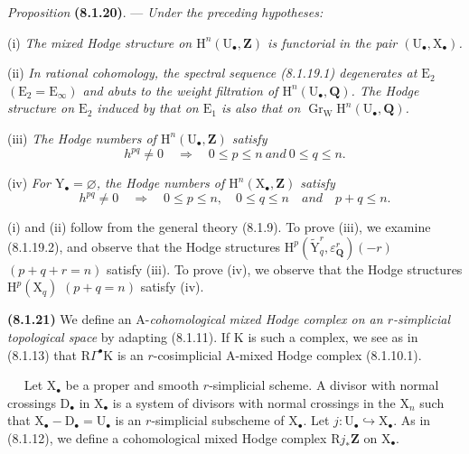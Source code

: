 \documentclass[11pt,leqno]{article}
\newcommand{\Page}[1]{\ifvmode\noindent\else\unskip\ \fi{\footnotesize\textcolor{gray}{[p.\,#1]}}\ \ignorespaces}
\begin{document}
\textit{Proposition} \textbf{(8.1.20)}. — \textit{Under the preceding hypotheses:}

(i) \textit{The mixed Hodge structure on \(\mathrm{H}^{n}(\mathrm{U}_{\bullet},\mathbf{Z})\) is functorial in the pair \((\mathrm{U}_{\bullet},\mathrm{X}_{\bullet})\).}

(ii) \textit{In rational cohomology, the spectral sequence (8.1.19.1) degenerates at \(\mathrm{E}_{2}\) \((\mathrm{E}_{2}=\mathrm{E}_{\infty})\) and abuts to the weight filtration of \(\mathrm{H}^{n}(\mathrm{U}_{\bullet},\mathbf{Q})\). The Hodge structure on \(\mathrm{E}_{2}\) induced by that on \(\mathrm{E}_{1}\) is also that on \(\operatorname{Gr}_{\mathrm{W}}\mathrm{H}^{n}(\mathrm{U}_{\bullet},\mathbf{Q})\).}

(iii) \textit{The Hodge numbers of \(\mathrm{H}^{n}(\mathrm{U}_{\bullet},\mathbf{Z})\) satisfy}
\[
h^{pq}\neq0
\quad\Rightarrow\quad
0\leq p\leq n\ \textit{and}\ 0\leq q\leq n.
\]

(iv) \textit{For \(\mathrm{Y}_{\bullet}=\varnothing\), the Hodge numbers of \(\mathrm{H}^{n}(\mathrm{X}_{\bullet},\mathbf{Z})\) satisfy}
\[
h^{pq}\neq0
\quad\Rightarrow\quad
0\leq p\leq n,\quad 0\leq q\leq n
\quad\textit{and}\quad p+q\leq n.
\]

(i) and (ii) follow from the general theory (8.1.9). To prove (iii), we examine (8.1.19.2), and observe that the Hodge structures \(\mathrm{H}^{p}(\widetilde{\mathrm{Y}}_{q}^{r},\varepsilon_{\mathbf{Q}}^{r})(-r)\) \((p+q+r=n)\) satisfy (iii). To prove (iv), we observe that the Hodge structures \(\mathrm{H}^{p}(\mathrm{X}_{q})\) \((p+q=n)\) satisfy (iv).

\textbf{(8.1.21)} We define an \(\mathrm{A}\)-\textit{cohomological mixed Hodge complex on an \(r\)-simplicial topological space} by adapting (8.1.11). If \(\mathrm{K}\) is such a complex, we see as in (8.1.13) that \(\mathrm{R}\Gamma^\bullet\mathrm{K}\) is an \(r\)-cosimplicial \(\mathrm{A}\)-mixed Hodge complex (8.1.10.1).

\Page{36}
Let \(\mathrm{X}_{\bullet}\) be a proper and smooth \(r\)-simplicial scheme. A divisor with normal crossings \(\mathrm{D}_{\bullet}\) in \(\mathrm{X}_{\bullet}\) is a system of divisors with normal crossings in the \(\mathrm{X}_{n}\) such that \(\mathrm{X}_{\bullet}-\mathrm{D}_{\bullet}=\mathrm{U}_{\bullet}\) is an \(r\)-simplicial subscheme of \(\mathrm{X}_{\bullet}\). Let \(j:\mathrm{U}_{\bullet}\hookrightarrow\mathrm{X}_{\bullet}\). As in (8.1.12), we define a cohomological mixed Hodge complex \(\mathrm{R}j_{\ast}\mathbf{Z}\) on \(\mathrm{X}_{\bullet}\).
\end{document}

